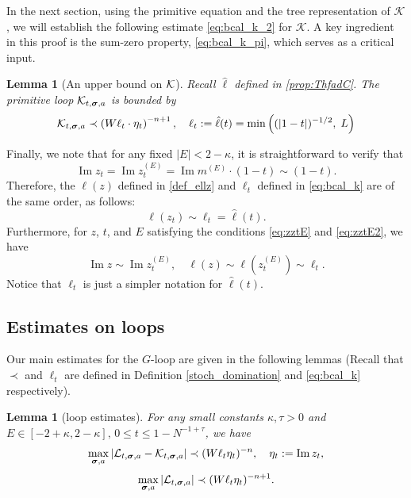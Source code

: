 \documentclass[10pt,reqno]{article}
\DeclareMathOperator{\im}{{\mathrm{Im}}}
\theoremstyle{plain} %
\newtheorem{lemma}[theorem]{Lemma}
\theoremstyle{remark}
\numberwithin{equation}{section}
\begin{document}
In the next section, using the primitive equation and the tree representation of $\mathcal{K}$, we will establish the following estimate \eqref{eq:bcal_k_2} for $\mathcal{K}$. %
A key ingredient in this proof is the  sum-zero property,  \eqref{eq:bcal_k_pi}, which serves as a critical input.


\begin{lemma}[An upper bound on ${\cal K}$]\label{ML:Kbound}
Recall $\hat \ell $ defined in \eqref{prop:ThfadC}. 
The  primitive loop ${\cal K}_{t, \boldsymbol{\sigma}, \textbf{a}}$ is bounded by
\begin{equation}\label{eq:bcal_k}
  {\cal K}_{t, \boldsymbol{\sigma}, \textbf{a}}  \prec \left(W \ell_t \cdot \eta_t \right)^{-n+1},\quad  \ell_t :  =\hat\ell(t)= \min\left((|1-t|)^{-1/2},\; L\right)       
\end{equation}
\end{lemma}

\bigskip

Finally, we note that for any fixed \(|E| < 2 - \kappa\), it is straightforward to verify that 
 \[
\im z_t = \im z_t^{(E)} = \im m^{(E)} \cdot (1 - t) \sim (1 - t).
\]
 Therefore, the \(\ell(z)\) defined in \eqref{def_ellz} and \(\ell_t\) defined in \eqref{eq:bcal_k} are of the same order, as follows:
 \[
\ell(z_t) \sim \ell_t = \hat{\ell}(t).
\]
Furthermore,  for \(z\), \(t\), and \(E\) satisfying the conditions \eqref{eq:zztE} and \eqref{eq:zztE2}, we have 
 \[
\im z\sim \im z^{(E)}_t,\quad \ell(z) \sim \ell(z^{(E)}_t) \sim \ell_t.
\]
Notice that \(\ell_t\) is just a simpler notation for $\hat{\ell}(t)$. 
 





\subsection{Estimates on loops}
 

Our main estimates for the  $G$-loop  are given in the following lemmas (Recall that $\prec$ and $\ell_t$ are defined in Definition \ref{stoch_domination} and \eqref{eq:bcal_k} respectively). 

\begin{lemma}[loop estimates]\label{ML:GLoop}
For any small constants $\kappa, \tau>0$ and  
$E \in[-2+\kappa, 2-\kappa], \, 0\le t\le 1-N^{-1+\tau}$,  
we have 
\begin{equation}\label{Eq:L-KGt}
 \max_{\boldsymbol{\sigma}, \textbf{a}}\left|{\cal L}_{t, \boldsymbol{\sigma}, \textbf{a}}-{\cal K}_{t, \boldsymbol{\sigma}, \textbf{a}}\right|\prec (W\ell_t\eta_t)^{-n},\quad \eta_t:=\im z_t,  %
\end{equation}
 \begin{equation}\label{Eq:L-KGt2}
\max_{\boldsymbol{\sigma}, \textbf{a}}\left|{\cal L}_{t, \boldsymbol{\sigma}, \textbf{a}} \right|\prec (W\ell_t\eta_t)^{-n+1}. %
\end{equation}
\end{lemma}
\end{document}

